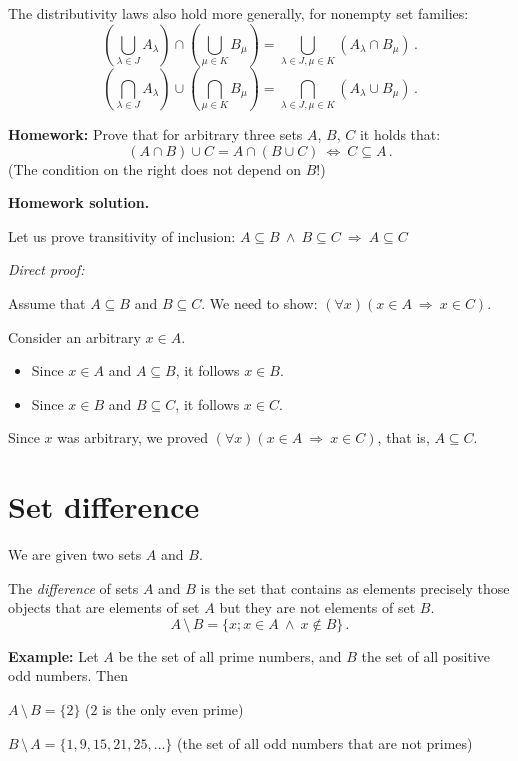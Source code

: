 \documentclass[11pt,paper=b5,footinclude,headinclude]{scrbook} %
\def\inn {{~\wedge~}}
\def\sledi {{~\Rightarrow~}}
\def\brez {{\,\setminus\,}}
\def\cee {{~\Leftrightarrow~}}
\theoremstyle{remark}
\theoremstyle{definition} %
\theoremstyle{theorem} %
\begin{document}
The distributivity laws also hold more generally, for nonempty set families:
$$(\bigcup_{\lambda\in J}A_\lambda)\cap (\bigcup_{\mu\in K}B_\mu) =
\bigcup_{\lambda\in J, \mu\in K}(A_\lambda\cap B_\mu)\,.$$
$$(\bigcap_{\lambda\in J}A_\lambda)\cup (\bigcap_{\mu\in K}B_\mu) =
\bigcap_{\lambda\in J, \mu\in K}(A_\lambda\cup B_\mu)\,.$$

\medskip
\textbf{ Homework:} Prove that for arbitrary three sets $A$, $B$, $C$ it holds that:
$$(A\cap B)\cup C = A\cap (B\cup C) \cee C\subseteq A\,.$$
(The condition on the right does not depend on $B$!)


\bigskip
\textbf{ Homework solution.}

Let us prove transitivity of inclusion: $A\subseteq B \inn B\subseteq C \sledi A \subseteq C$

{\em Direct proof:}

Assume that $A\subseteq B$ and $B\subseteq C$.
We need to show: $(\forall x)(x\in A\sledi x\in C)$.

Consider an arbitrary $x\in A$.
\begin{itemize}
  \item Since $x\in A$ and $A\subseteq B$, it follows $x\in B$.
  \item Since $x\in B$ and $B\subseteq C$, it follows $x\in C$.
\end{itemize}
Since $x$ was arbitrary, we proved $(\forall x)(x\in A\sledi x\in C)$, that is, $A\subseteq C$.

\bigskip

\section{Set difference}

We are given two sets $A$ and $B$.

The {\em difference}  of sets $A$ and $B$ is the set that contains as elements precisely those objects that are elements of set $A$ but they are not elements of set $B$.
$$A\brez B = \{x; x\in A\inn x\not\in B\}\,.$$

\textbf{ Example:}
Let $A$ be the set of all prime numbers, and $B$ the set of all positive odd numbers.
Then

$A\brez B = \{2\}$ ($2$ is the only even prime)

$B\brez A = \{1,9,15,21,25,\ldots\}$ (the set of all odd numbers that are not primes)

\bigskip
\end{document}
